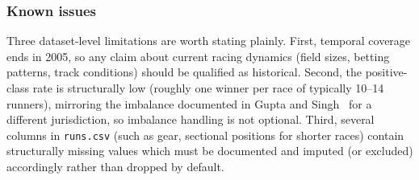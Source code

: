 \subsubsection*{\textbf{Known issues}} Three dataset-level limitations are worth stating plainly.
First, temporal coverage ends in 2005, so any claim about current racing dynamics
(field sizes, betting patterns, track conditions) should be qualified as
historical. Second, the positive-class rate is structurally low (roughly one winner
per race of typically 10--14 runners), mirroring the imbalance documented in
Gupta and Singh~\cite{ejeA_gupta2023} for a different jurisdiction, so imbalance
handling is not optional. Third, several columns in \texttt{runs.csv} (such as
gear, sectional positions for shorter races) contain structurally missing values
which must be documented and imputed (or excluded) accordingly rather than dropped
by default.